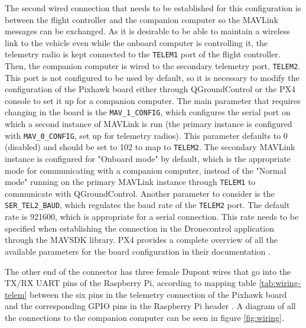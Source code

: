 The second wired connection that needs to be established for this configuration is between the flight controller and the companion computer so the MAVLink messages can be exchanged.
As it is desirable to be able to maintain a wireless link to the vehicle even while the onboard computer is controlling it, the telemetry radio is kept connected to the \texttt{TELEM1} port of the flight controller.
Then, the companion computer is wired to the secondary telemetry port, \texttt{TELEM2}.
This port is not configured to be used by default, so it is necessary to modify the configuration of the Pixhawk board either through QGroundControl or the PX4 console to set it up for a companion computer.
The main parameter that requires changing in the board is the \texttt{MAV\_1\_CONFIG}, which configures the serial port on which a second instance of MAVLink is run (the primary instance is configured with \texttt{MAV\_0\_CONFIG}, set up for telemetry radios).
This parameter defaults to 0 (disabled) and should be set to 102 to map to \texttt{TELEM2}.
The secondary MAVLink instance is configured for "Onboard mode" by default, which is the appropriate mode for communicating with a companion computer, instead of the "Normal mode" running on the primary MAVLink instance through \texttt{TELEM1} to communicate with QGroundControl.
Another parameter to consider is the \texttt{SER\_TEL2\_BAUD}, which regulates the baud rate of the \texttt{TELEM2} port.
The default rate is 921600, which is appropriate for a serial connection.
This rate needs to be specified when establishing the connection in the Dronecontrol application through the MAVSDK library.
PX4 provides a complete overview of all the available parameters for the board configuration in their documentation \cite{px4-docs-params}.

The other end of the connector has three female Dupont wires that go into the TX/RX UART pins of the Raspberry Pi,
according to mapping table \ref{tab:wiring-telem} between the six pins in the telemetry connection of the Pixhawk board and the corresponding GPIO pins in the Raspberry Pi header \cite{pixhawk-manual} \cite{pixhawk-px4}.
A diagram of all the connections to the companion computer can be seen in figure \ref{fig:wiring}.

